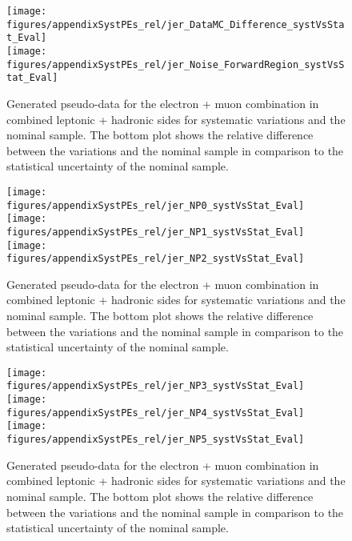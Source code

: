 \begin{figure}[!hb]
\begin{center}
        \texttt{[image: figures/appendixSystPEs\_rel/jer\_DataMC\_Difference\_systVsStat\_Eval]}\\
        \texttt{[image: figures/appendixSystPEs\_rel/jer\_Noise\_ForwardRegion\_systVsStat\_Eval]}\\
\caption{Generated pseudo-data for the electron + muon combination in combined leptonic + hadronic sides for systematic variations and the nominal \ttbar sample. The bottom plot shows the relative difference between the variations and the nominal sample in comparison to the statistical uncertainty of the nominal sample.}   
\label{fig:systematicVar_lephad_JER_1_1}
\end{center}
\end{figure}

\begin{figure}[!hb]
\begin{center}
        \texttt{[image: figures/appendixSystPEs\_rel/jer\_NP0\_systVsStat\_Eval]}\\
        \texttt{[image: figures/appendixSystPEs\_rel/jer\_NP1\_systVsStat\_Eval]}\\
        \texttt{[image: figures/appendixSystPEs\_rel/jer\_NP2\_systVsStat\_Eval]}\\
\caption{Generated pseudo-data for the electron + muon combination in combined leptonic + hadronic sides for systematic variations and the nominal \ttbar sample. The bottom plot shows the relative difference between the variations and the nominal sample in comparison to the statistical uncertainty of the nominal sample.}   
\label{fig:systematicVar_lephad_JER_1_2}
\end{center}
\end{figure}

\begin{figure}[!hb]
\begin{center}
        \texttt{[image: figures/appendixSystPEs\_rel/jer\_NP3\_systVsStat\_Eval]}\\
        \texttt{[image: figures/appendixSystPEs\_rel/jer\_NP4\_systVsStat\_Eval]}\\
        \texttt{[image: figures/appendixSystPEs\_rel/jer\_NP5\_systVsStat\_Eval]}\\
\caption{Generated pseudo-data for the electron + muon combination in combined leptonic + hadronic sides for systematic variations and the nominal \ttbar sample. The bottom plot shows the relative difference between the variations and the nominal sample in comparison to the statistical uncertainty of the nominal sample.}   
\label{fig:systematicVar_lephad_JER_1_3}
\end{center}
\end{figure}

